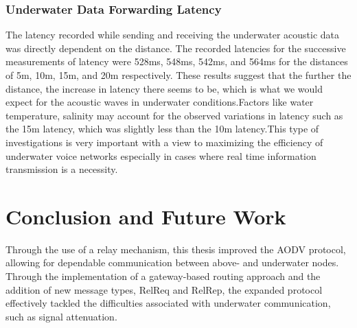 \documentclass[]{nsm-thesis}
\begin{document}
\subsection{Underwater Data Forwarding Latency}
The latency recorded while sending and receiving the underwater acoustic data was directly dependent on the distance. The recorded latencies for the successive measurements of latency were 528ms, 548ms, 542ms, and 564ms for the distances of 5m, 10m, 15m, and 20m respectively. These results suggest that the further the distance, the increase in latency there seems to be, which is what we would expect for the acoustic waves in underwater conditions.Factors like water temperature, salinity may account for the observed variations in latency such as the 15m latency, which was slightly less than the 10m latency.This type of investigations is very important with a view to maximizing the efficiency of underwater voice networks especially in cases where real time information transmission is a necessity.

\chapter{Conclusion and Future Work}
Through the use of a relay mechanism, this thesis improved the AODV  protocol, allowing for dependable communication between above- and underwater nodes. Through the implementation of a gateway-based routing approach and the addition of new message types, RelReq and RelRep, the expanded protocol effectively tackled the difficulties associated with underwater communication, such as signal attenuation.
\end{document}
